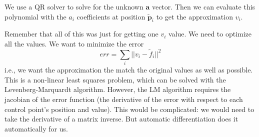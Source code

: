 \documentclass{article}
\begin{document}
We use a QR solver to solve for the unknown $\mathbf{a}$ vector. Then we can evaluate
this polynomial with the $a_i$ coefficients at position $\mathbf{\tilde{p}}_i$
to get the approximation $v_i$.

Remember that all of this was just for getting one $v_i$ value. We need to
optimize all the values. We want to minimize the error
\[
    err = \sum_i || v_i - \tilde{f}_i ||^2
\]
i.e., we want the approximation the match the original values as well as
possible. This is a non-linear least squares problem, which can be solved with
the Levenberg-Marquardt algorithm. However, the LM algorithm requires the
jacobian of the error function (the derivative of the error with respect to each
control point's position and value). This would be complicated: we would need to
take the derivative of a matrix inverse. But automatic differentiation does it
automatically for us.
\end{document}
